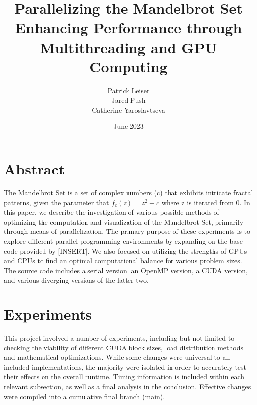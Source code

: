 \documentclass{article}
\begin{document}
\title{\textbf{Parallelizing the Mandelbrot Set \\ \large Enhancing Performance through Multithreading and GPU Computing}}
\author{\begin{tabular}{cc}Patrick Leiser\\
Jared Push\\Catherine Yaroslavtseva\\\end{tabular}}

\date{June 2023}

\maketitle

\section{Abstract}

The Mandelbrot Set is a set of complex numbers (c) that exhibits intricate fractal patterns, given the parameter that $f_c(z) = z^2 + c$ where z is iterated from 0.
In this paper, we describe the investigation of various possible methods of optimizing the computation and visualization of the Mandelbrot Set, primarily through means of parallelization.
The primary purpose of these experiments is to explore different parallel programming environments by expanding on the base code provided by [INSERT].
We also focused on utilizing the strengths of GPUs and CPUs to find an optimal computational balance for various problem sizes.\\ 

The source code includes a serial version, an OpenMP version, a CUDA version, and various diverging versions of the latter two.

\section{Experiments}

This project involved a number of experiments, including but not limited to checking the viability of different CUDA block sizes, load distribution methods and mathematical optimizations.
While some changes were universal to all included implementations, the majority were isolated in order to accurately test their effects on the overall runtime.
Timing information is included within each relevant subsection, as well as a final analysis in the conclusion.
Effective changes were compiled into a cumulative final branch (main).
\end{document}
